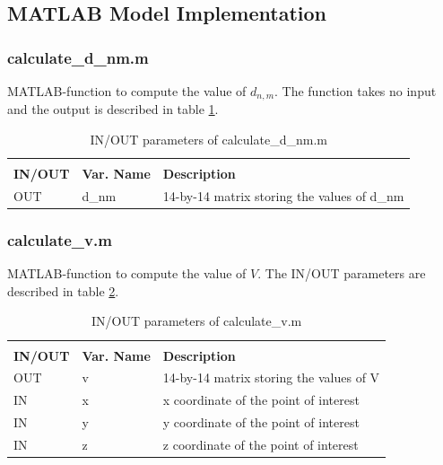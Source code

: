 \subsection{MATLAB Model Implementation}

\subsubsection{calculate\_d\_nm.m}
MATLAB-function to compute the value of $d_{n,m}$. The function takes no input and the output is described in table \ref{tab:d}.
\begin{table}[H]
\centering
\caption{IN/OUT parameters of calculate\_d\_nm.m}
\label{tab:d}
\begin{tabular}{lll}
\rowcolor[HTML]{000000} 
\multicolumn{3}{l}{\cellcolor[HTML]{000000}{\color[HTML]{FFFFFF} calculate\_d\_nm.m: calculates the value of $d_{n,m}$ function}}                                                \\
\rowcolor[HTML]{000000} 
{\color[HTML]{FFFFFF} \textbf{IN/OUT}} & {\color[HTML]{FFFFFF} \textbf{Var. Name}} & {\color[HTML]{FFFFFF} \textbf{Description}} \\
OUT & d\_nm & 14-by-14 matrix storing the values of d\_nm

\end{tabular}%
\end{table}


\subsubsection{calculate\_v.m}
MATLAB-function to compute the value of $V$. The IN/OUT parameters are described in table \ref{tab:v}.
\begin{table}[H]
\centering
\caption{IN/OUT parameters of calculate\_v.m}
\label{tab:v}
\begin{tabular}{lll}
\rowcolor[HTML]{000000} 
\multicolumn{3}{l}{\cellcolor[HTML]{000000}{\color[HTML]{FFFFFF} calculate\_v.m: calculates the value of $d_{n,m}$ function}}                                                \\
\rowcolor[HTML]{000000} 
{\color[HTML]{FFFFFF} \textbf{IN/OUT}} & {\color[HTML]{FFFFFF} \textbf{Var. Name}} & {\color[HTML]{FFFFFF} \textbf{Description}} \\
OUT & v & 14-by-14 matrix storing the values of V\\
IN & x & x coordinate of the point of interest\\
IN & y & y coordinate of the point of interest\\
IN & z & z coordinate of the point of interest
\end{tabular}%
\end{table}

